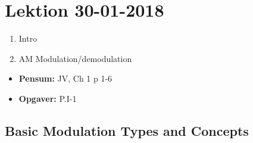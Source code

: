 \section{Lektion 30-01-2018}

\begin{enumerate}
	\item Intro
	\item AM Modulation/demodulation
\end{enumerate}

\begin{mdframed}[style=exampledefault]
	\begin{itemize}
		\item \textbf{Pensum:} JV, Ch 1 p 1-6
		\item \textbf{Opgaver:} P.I-1
	\end{itemize}
\end{mdframed}

\subsection{Basic Modulation Types and Concepts}

